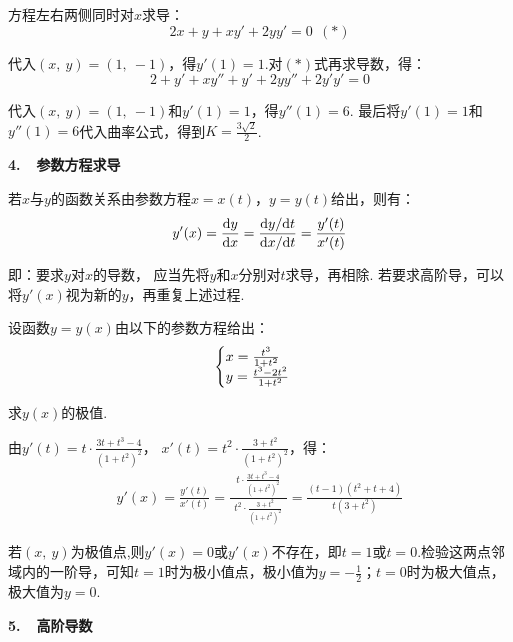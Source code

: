 \begin{solution}
方程左右两侧同时对$x$求导：
$$
2x+y+xy'+2yy'=0~~(*)
$$

代入$(x,~y)=(1,~-1)$，得$y'(1)=1$.对$(*)$式再求导数，得：
$$
2+y'+xy''+y'+2yy''+2y'y'=0
$$\par

代入$(x,~y)=(1,~-1)$和$y'(1)=1$，得$y''(1)=6$. 最后将$y'(1)=1$和$y''(1)=6$代入曲率公式，得到$K=\frac{3\sqrt{2}}{2}$.
\end{solution}

\textbf{4.~~参数方程求导}\vspace{0.25em}

若$x$与$y$的函数关系由参数方程$x=x(t)$，$y=y(t)$给出，则有：
$$
\setlength\abovedisplayskip{10pt}
\setlength\belowdisplayskip{10pt}
y'(x)=\frac{\d y}{\d x}=\frac{\d y / \d t}{\d x / \d t} = \frac{y'(t)}{x'(t)}
$$

即：要求$y$对$x$的导数，
应当先将$y$和$x$分别对$t$求导，再相除.
若要求高阶导，可以将$y'(x)$视为新的$y$，再重复上述过程.

\begin{example}
\label{ex:ch02-07}
设函数$y=y(x)$由以下的参数方程给出：
\[
\setstcolor{1.5}
\begin{cases}
x = \frac{t^3}{1+t^2} \\
y = \frac{t^3-2t^2}{1+t^2}
\end{cases}
\] 

求$y(x)$的极值.
\end{example}

\begin{solution}
由$y'(t)=t \cdot \frac{3t+t^3-4}{(1+t^2)^2}$，
$x'(t)=t^2\cdot \frac{3+t^2}{(1+t^2)^2}$，得：
\begin{equation}
    \begin{aligned}
        y'(x)
        = \frac{y'(t)}{x'(t)}
        = \frac{~~t\cdot \displaystyle\frac{3t+t^3-4}{(1+t^2)^2}~~}{~~t^2\cdot\displaystyle\frac{3+t^2}{(1+t^2)^2}~~}
        = \frac{(t-1)(t^2+t+4)}{t(3+t^2)}
        \nonumber
    \end{aligned}
\end{equation}\par
若$(x,~y)$为极值点,则$y'(x)=0$或$y'(x)$不存在，即$t=1$或$t=0$.检验这两点邻域内的一阶导，可知$t=1$时为极小值点，极小值为$y=-\frac{1}{2}$；$t=0$时为极大值点，极大值为$y=0$.
\end{solution}

\textbf{5.~~高阶导数}\vspace{0.25em}

